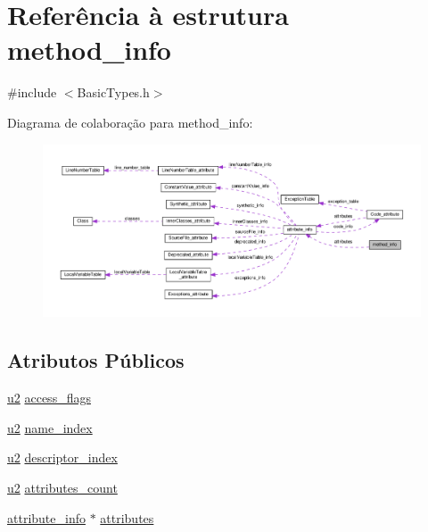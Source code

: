 \hypertarget{structmethod__info}{}\section{Referência à estrutura method\+\_\+info}
\label{structmethod__info}


{\ttfamily \#include $<$Basic\+Types.\+h$>$}



Diagrama de colaboração para method\+\_\+info\+:
\nopagebreak
\begin{figure}[H]
\begin{center}
\leavevmode
\includegraphics[width=350pt]{structmethod__info__coll__graph}
\end{center}
\end{figure}
\subsection*{Atributos Públicos}
\begin{DoxyCompactItemize}
\item 
\hyperlink{BasicTypes_8h_a732cde1300aafb73b0ea6c2558a7a54f}{u2} \hyperlink{structmethod__info_a3b657027a141cdbc94ded28607c98be5}{access\+\_\+flags}
\item 
\hyperlink{BasicTypes_8h_a732cde1300aafb73b0ea6c2558a7a54f}{u2} \hyperlink{structmethod__info_ab91d62d0658b77bba83f6bb685e3bbb9}{name\+\_\+index}
\item 
\hyperlink{BasicTypes_8h_a732cde1300aafb73b0ea6c2558a7a54f}{u2} \hyperlink{structmethod__info_a7713103e0c8d060630ad62774fb9be37}{descriptor\+\_\+index}
\item 
\hyperlink{BasicTypes_8h_a732cde1300aafb73b0ea6c2558a7a54f}{u2} \hyperlink{structmethod__info_ad9e5e1e2fc850806addadd6deab8565d}{attributes\+\_\+count}
\item 
\hyperlink{structattribute__info}{attribute\+\_\+info} $\ast$ \hyperlink{structmethod__info_a8ce4caaa03680c91f548558a38647ad8}{attributes}
\end{DoxyCompactItemize}


